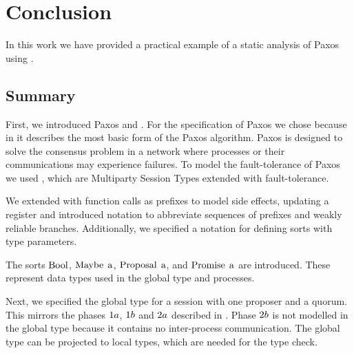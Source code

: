 \chapter{Conclusion}
\label{chapter:conclusion}
In this work we have provided a practical example of a static analysis of Paxos using \FTMPST.

\section{Summary}
First, we introduced Paxos and \FTMPST.
For the specification of Paxos we chose \cite{Lamport01} because in it \citeauthor{Lamport01} describes the most basic form of the Paxos algorithm.
Paxos is designed to solve the consensus problem in a network where processes or their communications may experience failures.
To model the fault-tolerance of Paxos we used \FTMPST, which are Multiparty Session Types extended with fault-tolerance.

We extended \FTMPST with function calls as prefixes to model side effects, \eg updating a register and introduced notation to abbreviate sequences of prefixes and weakly reliable branches.
Additionally, we specified a notation for defining sorts with type parameters.

The sorts $\operatorname{Bool}$, $\operatorname{Maybe}\; \operatorname{a}$, $\operatorname{Proposal}\; \operatorname{a}$, and $\operatorname{Promise}\; \operatorname{a}$ are introduced.
These represent data types used in the global type and processes.

Next, we specified the global type for a session with one proposer and a quorum.
This mirrors the phases $1a$, $1b$ and $2a$ described in \cite{Lamport01}.
Phase $2b$ is not modelled in the global type because it contains no inter-process communication.
The global type can be projected to local types, which are needed for the type check.

